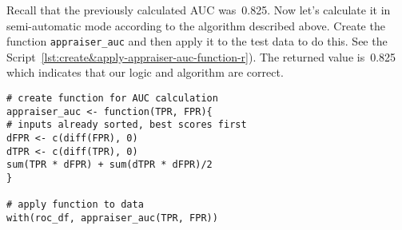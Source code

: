 \documentclass[]{scrreprt}
\begin{document}
Recall that the previously calculated AUC was~0.825. Now let's calculate it in semi-automatic mode according to the algorithm described above. Create the function \texttt{appraiser\_auc} and then apply it to the test data to do this. See the Script~\ref{lst:create&apply-appraiser-auc-function-r}). The returned value is~0.825 which indicates that our logic and algorithm are correct.
%
\begin{lstlisting}[float=htp, caption = Creating a function to calculate AUC in semi-automatic mode and applying it to test data, firstnumber=1, label= lst:create&apply-appraiser-auc-function-r]
# create function for AUC calculation
appraiser_auc <- function(TPR, FPR){
# inputs already sorted, best scores first 
dFPR <- c(diff(FPR), 0)
dTPR <- c(diff(TPR), 0)
sum(TPR * dFPR) + sum(dTPR * dFPR)/2
}

# apply function to data
with(roc_df, appraiser_auc(TPR, FPR))
\end{lstlisting}
\end{document}

